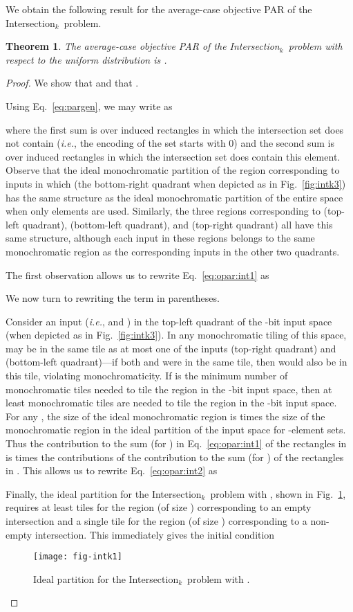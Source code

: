 \documentclass{article}
\theoremstyle{theorem}
\newtheorem{theorem}{Theorem}[section]
\theoremstyle{definition}
\theoremstyle{remark}
\newcommand{\ie}{\emph{i.e.}}
\newcommand{\intersection}{{\sc In\-ter\-sec\-tion}\ensuremath{_k}}
\begin{document}
We obtain the following result for the average-case objective PAR of the \intersection\ problem.
\begin{theorem}
The average-case objective PAR of the \intersection\ problem with respect to the uniform distribution is .
\end{theorem}
\begin{proof}
We show that  and that .

Using Eq.~\ref{eq:pargen}, we may write  as

where the first sum is over induced rectangles  in which the intersection set does not contain  (\ie, the encoding of the set starts with 0) and the second sum is over induced rectangles  in which the intersection set does contain this element.  Observe that the ideal monochromatic partition of the region corresponding to inputs in which  (the bottom-right quadrant when depicted as in Fig.~\ref{fig:intk3}) has the same structure as the ideal monochromatic partition of the entire space when only  elements are used.  Similarly, the three regions corresponding to  (top-left quadrant),  (bottom-left quadrant), and  (top-right quadrant) all have this same structure, although each input in these regions belongs to the same monochromatic region as the corresponding inputs in the other two quadrants.

The first observation allows us to rewrite Eq.~\ref{eq:opar:int1} as

We now turn to rewriting the term in parentheses.

Consider an input  (\ie,  and ) in the top-left quadrant of the -bit input space (when depicted as in Fig.~\ref{fig:intk3}).  In any monochromatic tiling of this space,  may be in the same tile as at most one of the inputs  (top-right quadrant) and  (bottom-left quadrant)---if both  and  were in the same tile, then  would also be in this tile, violating monochromaticity.  If  is the minimum number of monochromatic tiles needed to tile the region  in the -bit input space, then at least  monochromatic tiles are needed to tile the region  in the -bit input space.  For any , the size of the ideal monochromatic region  is  times the size of the monochromatic region  in the ideal partition of the input space for -element sets.  Thus the contribution to the sum (for ) in Eq.~\ref{eq:opar:int1} of the rectangles  in  is  times the contributions of the contribution to the sum (for ) of the rectangles  in .  This allows us to rewrite Eq.~\ref{eq:opar:int2} as

Finally, the ideal partition for the \intersection\ problem with , shown in Fig.~\ref{fig:intk1}, requires at least  tiles for the region (of size ) corresponding to an empty intersection and a single tile for the region (of size ) corresponding to a non-empty intersection.  This immediately gives the initial condition

\begin{figure}[htp]
\begin{center}
\texttt{[image: fig-intk1]}
\end{center}
\caption{Ideal partition for the \intersection\ problem with .}\label{fig:intk1}
\end{figure}
\end{proof}
\end{document}
